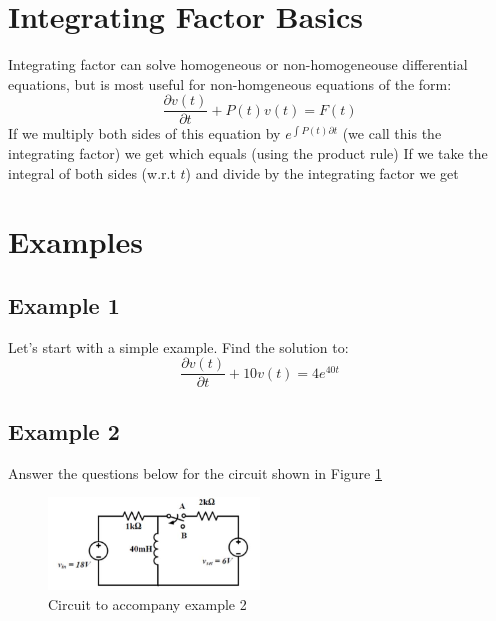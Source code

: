 \documentclass{handout}
\begin{document}
\section{Integrating Factor Basics}
Integrating factor can solve homogeneous or non-homogeneouse differential equations, but is most useful for non-homgeneous equations of the form:
\[
\frac{\partial v(t)}{\partial t} + P(t)v(t) = F(t)
\]
If we multiply both sides of this equation by $e^{\int P(t) \partial t}$ (we call this the integrating factor) we get
\soln{0.75in}{
\[
e^{\int P(t) \partial t}\frac{\partial v(t)}{\partial t} + e^{\int P(t) \partial t}P(t)v(t) = F(t)e^{\int P(t) \partial t}
\]
}
which equals (using the product rule)
\soln{0.75in}{
\[
\frac{\partial}{\partial t}\left[ e^{\int P(t) \partial t}v(t) \right]= F(t)e^{\int P(t) \partial t}
\]
}
If we take the integral of both sides (w.r.t $t$) and divide by the integrating factor we get
\soln{0.75in}{
\[
v(t) = \frac{\int F(t)e^{\int P(t) \partial t}\partial t}{e^{\int P(t) \partial t}}
\]
}

\newpage
\clearpage
\pagebreak

\section{Examples}
\subsection{Example 1}
Let's start with a simple example.  Find the solution to:
\[
\frac{\partial v(t)}{\partial t} + 10v(t) = 4e^{40t}
\]


\newpage
\clearpage
\pagebreak

\subsection{Example 2}
Answer the questions below for the circuit shown in Figure \ref{fig: Example2}
\begin{figure} [h!]
\centering
\includegraphics[width=0.5\textwidth]{Example2.jpg}
\caption{Circuit to accompany example 2}
\label{fig: Example2}
\end{figure}
\end{document}
